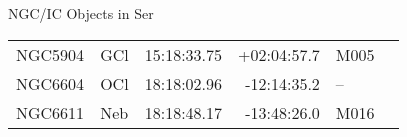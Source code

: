 \begin{block}{NGC/IC Objects in Ser}
  \centering
  \begin{tabularx}{\textwidth}{llrrll} \toprule 
    NGC5904 & GCl & 15:18:33.75 & +02:04:57.7  & M005 \\
    NGC6604 & OCl & 18:18:02.96 & -12:14:35.2  & -- \\ 
    NGC6611 & Neb & 18:18:48.17 & -13:48:26.0  & M016 \\  \bottomrule
  \end{tabularx}
\end{block}
